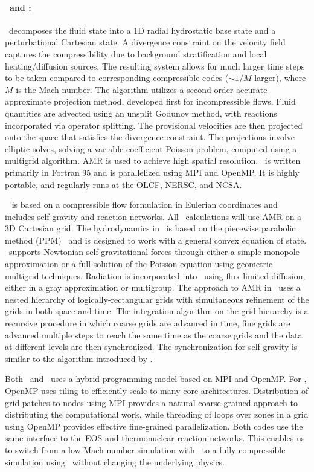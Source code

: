 \paragraph{\maestro\ and \castro: } 
%
\maestro\ decomposes the fluid state into a 1D radial hydrostatic base
state and a perturbational Cartesian state.  A divergence constraint
on the velocity field captures the compressibility due to background
stratification and local heating/diffusion sources.  The resulting
system allows for much larger time steps to be taken compared to
corresponding compressible codes ($\sim 1/M$ larger), where $M$ is the
Mach number.  The algorithm \cite{multilevel} utilizes a second-order
accurate approximate projection method, developed first for
incompressible flows.  Fluid quantities are advected using an unsplit
Godunov method, with reactions incorporated via operator splitting.
The provisional velocities are then projected onto the space that
satisfies the divergence constraint.  The projections involve elliptic
solves, solving a variable-coefficient Poisson problem, computed using
a multigrid algorithm.  AMR is used to achieve high spatial
resolution.  \maestro\ is written primarily in Fortran 95 and is
parallelized using MPI and OpenMP.  It is highly portable, and
regularly runs at the OLCF, NERSC, and NCSA.

\castro~\cite{castro} is based on a compressible flow formulation in
Eulerian coordinates and includes self-gravity and reaction networks.
All \castro\ calculations will use AMR on a 3D Cartesian grid.  The
hydrodynamics in \castro\ is based on the piecewise parabolic method
(PPM)~\cite{ppmunsplit} and is designed to work with a general convex
equation of state.  \castro\ supports Newtonian self-gravitational
forces through either a simple monopole approximation or a full
solution of the Poisson equation using geometric multigrid techniques.
Radiation is incorporated into \castro\ using flux-limited diffusion,
either in a gray approximation or multigroup.  The approach to AMR in
\castro\ uses a nested hierarchy of logically-rectangular grids with
simultaneous refinement of the grids in both space and time.  The
integration algorithm on the grid hierarchy is a recursive procedure
in which coarse grids are advanced in time, fine grids are advanced
multiple steps to reach the same time as the coarse grids and the data
at different levels are then synchronized.  The synchronization for
self-gravity is similar to the algorithm introduced by
\cite{miniati-colella}.

Both \maestro\ and \castro\ uses a hybrid programming model based on
MPI and OpenMP.  For \castro, OpenMP uses tiling to efficiently scale
to many-core architectures.    Distribution of
grid patches to nodes using MPI provides a natural coarse-grained
approach to distributing the computational work, while threading of
loops over zones in a grid using OpenMP provides effective
fine-grained parallelization.  Both codes use the same interface to
the EOS and thermonuclear reaction networks.  This enables us to
switch from a low Mach number simulation with \maestro\ to a fully
compressible simulation using \castro\ without changing the underlying
physics.

